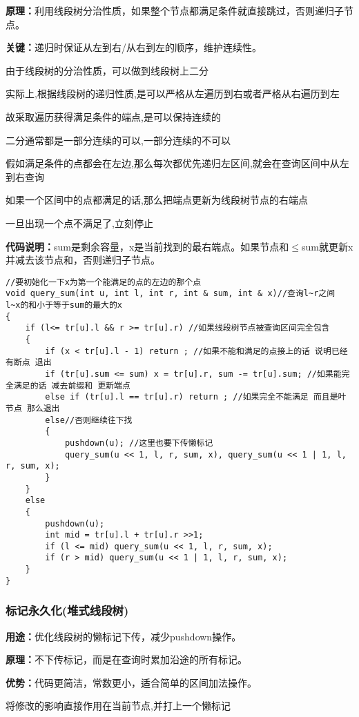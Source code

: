 \documentclass[a4paper, fontset=none]{ctexart}
\begin{document}
\textbf{原理：}利用线段树分治性质，如果整个节点都满足条件就直接跳过，否则递归子节点。

\textbf{关键：}递归时保证从左到右/从右到左的顺序，维护连续性。

由于线段树的分治性质，可以做到线段树上二分

实际上,根据线段树的递归性质,是可以严格从左遍历到右或者严格从右遍历到左

故采取遍历获得满足条件的端点,是可以保持连续的

二分通常都是一部分连续的可以,一部分连续的不可以 

假如满足条件的点都会在左边,那么每次都优先递归左区间,就会在查询区间中从左到右查询

如果一个区间中的点都满足的话,那么把端点更新为线段树节点的右端点

一旦出现一个点不满足了,立刻停止

\textbf{代码说明：}sum是剩余容量，x是当前找到的最右端点。如果节点和$\leq$sum就更新x并减去该节点和，否则递归子节点。
\begin{verbatim}
//要初始化一下x为第一个能满足的点的左边的那个点
void query_sum(int u, int l, int r, int & sum, int & x)//查询l~r之间 l~x的和小于等于sum的最大的x
{
    if (l<= tr[u].l && r >= tr[u].r) //如果线段树节点被查询区间完全包含
    {
        if (x < tr[u].l - 1) return ; //如果不能和满足的点接上的话 说明已经有断点 退出
        if (tr[u].sum <= sum) x = tr[u].r, sum -= tr[u].sum; //如果能完全满足的话 减去前缀和 更新端点
        else if (tr[u].l == tr[u].r) return ; //如果完全不能满足 而且是叶节点 那么退出
        else//否则继续往下找
        {
            pushdown(u); //这里也要下传懒标记
            query_sum(u << 1, l, r, sum, x), query_sum(u << 1 | 1, l, r, sum, x);
        }
    }
    else
    {
        pushdown(u);
        int mid = tr[u].l + tr[u].r >>1;
        if (l <= mid) query_sum(u << 1, l, r, sum, x);
        if (r > mid) query_sum(u << 1 | 1, l, r, sum, x);
    }
}
\end{verbatim}
\subsubsection{标记永久化(堆式线段树)}
\textbf{用途：}优化线段树的懒标记下传，减少pushdown操作。

\textbf{原理：}不下传标记，而是在查询时累加沿途的所有标记。

\textbf{优势：}代码更简洁，常数更小，适合简单的区间加法操作。

将修改的影响直接作用在当前节点,并打上一个懒标记
\end{document}
